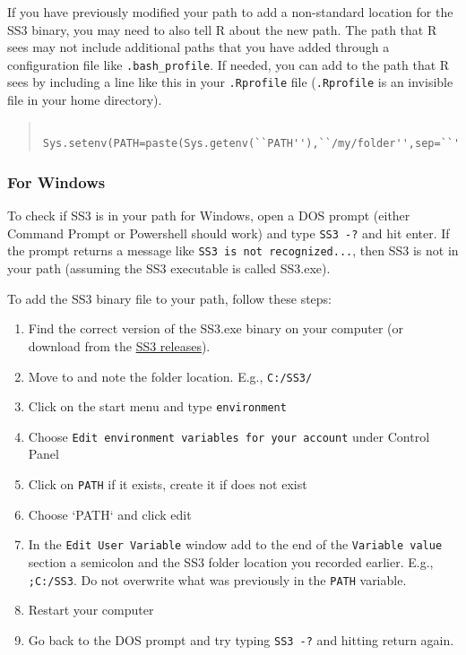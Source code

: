If you have previously modified your path to add a non-standard location for the SS3 binary, you may need to also tell R about the new path. The path that R sees may not include additional paths that you have added through a configuration file like \texttt{.bash\_profile}. If needed, you can add to the path that R sees by including a line like this in your \texttt{.Rprofile} file (\texttt{.Rprofile} is an invisible file in your home directory).

\begin{quote}
   \begin{verbatim}
    Sys.setenv(PATH=paste(Sys.getenv(``PATH''),``/my/folder'',sep=``'':''))
    \end{verbatim}
\end{quote}

\subsubsection{For Windows}

To check if SS3 is in your path for Windows, open a DOS prompt (either Command Prompt or Powershell should work) and type \texttt{SS3 -?} and hit enter. If the prompt returns a message like \texttt{SS3 is not recognized...}, then SS3 is not in your path (assuming the SS3 executable is called SS3.exe).

To add the SS3 binary file to your path, follow these steps:

\begin{enumerate}
  \item Find the correct version of the SS3.exe binary on your computer (or download from the \href{https://github.com/nmfs-stock-synthesis/stock-synthesis/releases}{SS3 releases}).
  \item Move to and note the folder location. E.g., \texttt{C:/SS3/}
  \item Click on the start menu and type \texttt{environment}
  \item Choose \texttt{Edit environment variables for your account} under Control Panel
  \item Click on \texttt{PATH} if it exists, create it if does not exist 
  \item Choose `PATH` and click edit
  \item In the \texttt{Edit User Variable} window add to the end of the \texttt{Variable value} section a semicolon and the SS3 folder location you recorded earlier.
     E.g., \texttt{;C:/SS3}. Do not overwrite what was previously in the \texttt{PATH} variable.
  \item Restart your computer
  \item Go back to the DOS prompt and try typing \texttt{SS3 -?} and hitting return again.
\end{enumerate}


